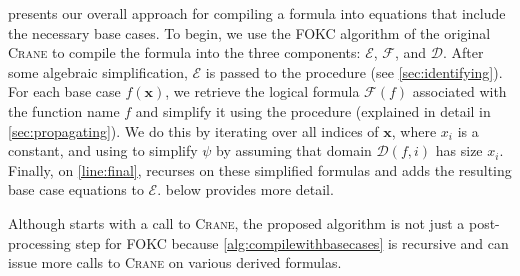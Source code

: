 \documentclass[a4paper,UKenglish,cleveref, autoref, thm-restate]{lipics-v2021}
\begin{document}
 presents our overall approach for compiling a
formula into equations that include the necessary base cases. To begin, we use
the FOKC algorithm of the original \textsc{Crane} to compile the formula into
the three components: $\mathcal{E}$, $\mathcal{F}$, and $\mathcal{D}$. After
some algebraic simplification, $\mathcal{E}$ is passed to the \FindBaseCases
procedure (see \cref{sec:identifying}). For each base case $f(\mathbf{x})$, we
retrieve the logical formula $\mathcal{F}(f)$ associated with the function name
$f$ and simplify it using the \Propagate procedure (explained in detail in
\cref{sec:propagating}). We do this by iterating over all indices of
$\mathbf{x}$, where $x_{i}$ is a constant, and using \Propagate to simplify
$\psi$ by assuming that domain $\mathcal{D}(f, i)$ has size $x_{i}$. Finally, on
\autoref{line:final}, \CompileWithBaseCases recurses on these simplified
formulas and adds the resulting base case equations to $\mathcal{E}$.
 below provides more detail.

\begin{remark*}
  Although \CompileWithBaseCases starts with a call to \textsc{Crane}, the
  proposed algorithm is not just a post-processing step for FOKC because
  \cref{alg:compilewithbasecases} is recursive and can issue more calls to
  \textsc{Crane} on various derived formulas.
\end{remark*}
\end{document}
